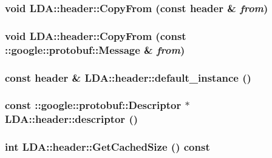 \label{class_l_d_a_1_1header_a650d9337806ae2b17519c035d90eecf6}
\hypertarget{class_l_d_a_1_1header_a3282db68eb557717e0f127a54b029335}{
\subsubsection[{CopyFrom}]{\setlength{\rightskip}{0pt plus 5cm}void LDA::header::CopyFrom (const {\bf header} \& {\em from})}}
\label{class_l_d_a_1_1header_a3282db68eb557717e0f127a54b029335}
\hypertarget{class_l_d_a_1_1header_a828584601b36d9c982f53f8924934b49}{
\subsubsection[{CopyFrom}]{\setlength{\rightskip}{0pt plus 5cm}void LDA::header::CopyFrom (const ::google::protobuf::Message \& {\em from})}}
\label{class_l_d_a_1_1header_a828584601b36d9c982f53f8924934b49}
\hypertarget{class_l_d_a_1_1header_ab2cc2ceeda340e84675d0194a700230e}{
\subsubsection[{default\_\-instance}]{\setlength{\rightskip}{0pt plus 5cm}const {\bf header} \& LDA::header::default\_\-instance ()}}
\label{class_l_d_a_1_1header_ab2cc2ceeda340e84675d0194a700230e}
\hypertarget{class_l_d_a_1_1header_ad6bb3d8bcef004268dd63526606ad08a}{
\subsubsection[{descriptor}]{\setlength{\rightskip}{0pt plus 5cm}const ::google::protobuf::Descriptor $\ast$ LDA::header::descriptor ()}}
\label{class_l_d_a_1_1header_ad6bb3d8bcef004268dd63526606ad08a}
\hypertarget{class_l_d_a_1_1header_a94543e30afd06f46e7d4a1d878630dda}{
\subsubsection[{GetCachedSize}]{\setlength{\rightskip}{0pt plus 5cm}int LDA::header::GetCachedSize () const}}
